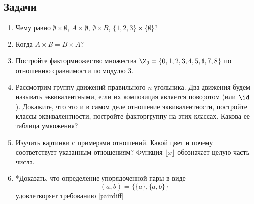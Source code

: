 \subsection*{Задачи}
\begin{enumerate}
\item Чему равно $\emptyset\times\emptyset$, $A\times\emptyset$, $\emptyset\times B$, $\{1,2,3\}\times\{\emptyset\}$?
\item Когда $A\times B = B\times A$?
\item Постройте фактормножество множества $\Z_9=\{0,1,2,3,4,5,6,7,8\}$ по отношению сравнимости по модулю $3$.
\item Рассмотрим группу движений правильного $n$-угольника. Два движения будем называть эквивалентными, если их композиция является поворотом (или $\id$). Докажите, что это и в самом деле отношение эквивалентности, постройте классы эквивалентности, постройте факторгруппу на этих классах. Какова ее таблица умножения?
\item Изучить картинки с примерами отношений. Какой цвет и почему соответствует указанным отношениям? Функция $\lfloor x\rfloor$ обозначает целую часть числа.
\item *Доказать, что определение упорядоченной пары в виде
$$
(a,b) = \{\{a\},\{a,b\}\}
$$
удовлетворяет требованию \eqref{pairdiff}
\end{enumerate}
